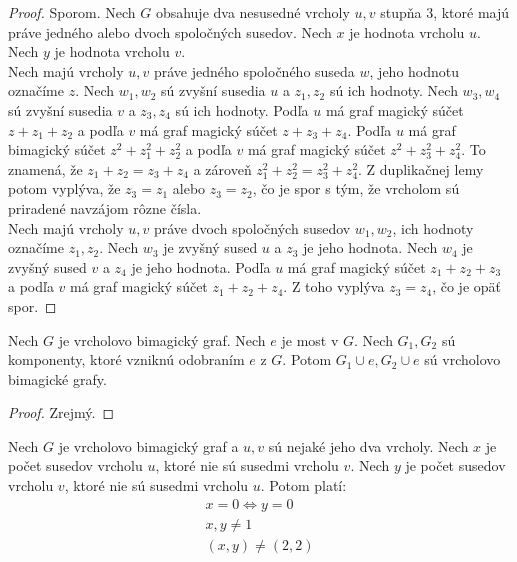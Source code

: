 \begin{proof} Sporom. Nech $G$ obsahuje dva nesusedné vrcholy $u,v$ stupňa 3, ktoré majú práve jedného alebo dvoch spoločných susedov. Nech $x$ je hodnota vrcholu $u$. Nech $y$ je hodnota vrcholu $v$. \\

Nech majú vrcholy $u,v$ práve jedného spoločného suseda $w$, jeho hodnotu označíme $z$. Nech $w_1, w_2$ sú zvyšní susedia $u$ a $z_1, z_2$ sú ich hodnoty. Nech $w_3, w_4$ sú zvyšní susedia $v$ a $z_3, z_4$ sú ich hodnoty. Podľa $u$ má graf magický súčet $z + z_1 + z_2$ a podľa $v$ má graf magický súčet $z + z_3 + z_4$. Podľa $u$ má graf bimagický súčet $z^2 + z^2_1 + z^2_2$ a podľa $v$ má graf magický súčet $z^2 + z^2_3 + z^2_4$. To znamená, že $z_1 + z_2 = z_3 + z_4$ a zároveň $z^2_1 + z^2_2 = z^2_3 + z^2_4$. Z duplikačnej lemy potom vyplýva, že $z_3 = z_1$ alebo $z_3 = z_2$, čo je spor s tým, že vrcholom sú priradené navzájom rôzne čísla. \\

Nech majú vrcholy $u,v$ práve dvoch spoločných susedov $w_1, w_2$, ich hodnoty označíme $z_1, z_2$. Nech $w_3$ je zvyšný sused $u$ a $z_3$ je jeho hodnota. Nech $w_4$ je zvyšný sused $v$ a $z_4$ je jeho hodnota. Podľa $u$ má graf magický súčet $z_1 + z_2 + z_3$ a podľa $v$ má graf magický súčet $z_1 + z_2 + z_4$. Z toho vyplýva $z_3 = z_4$, čo je opäť spor.
\end{proof}

\begin{theorem} Nech $G$ je vrcholovo bimagický graf. Nech $e$ je most v $G$. Nech $G_1, G_2$ sú komponenty, ktoré vzniknú odobraním $e$ z $G$. Potom $G_1 \cup e, G_2 \cup e$ sú vrcholovo bimagické grafy. 
\end{theorem}

\begin{proof}
Zrejmý.
\end{proof}

\begin{theorem} Nech $G$ je vrcholovo bimagický graf a $u,v$ sú nejaké jeho dva vrcholy. Nech $x$ je počet susedov vrcholu $u$, ktoré nie sú susedmi vrcholu $v$. Nech $y$ je počet susedov vrcholu $v$, ktoré nie sú susedmi vrcholu $u$. Potom platí:
\begin{gather*}
\label{vbgcondition}
x = 0 \iff y = 0 \\
x,y \neq 1 \\
(x,y) \neq (2,2)
\end{gather*}
\end{theorem}


